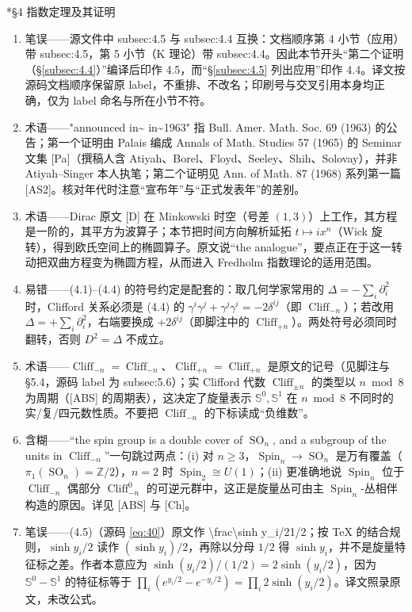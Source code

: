 \documentclass[11pt]{amsart}
\makeatletter
\def\subsection{\@startsection{subsection}{2}%
   \z@{1.25\linespacing\@plus.7\linespacing}{.5\linespacing}%
   {\normalfont\bfseries}}
\theoremstyle{definition}
\theoremstyle{remark}
\theoremstyle{plain}
\numberwithin{equation}{section}
\renewcommand{\:}{\colon}
\DeclareMathOperator{\Spin}{Spin}
\newcommand{\ZZ}{{\mathbb Z}}
\DeclareMathOperator{\SO}{SO}
\DeclareMathOperator{\Cliff}{Cliff}
\newcommand{\Cnm}{\Cliff_{-n}}
\newcommand{\Cnp}{\Cliff_{+n}}
\renewcommand{\SS}{\mathbb{S}}
\makeatother
\begin{document}
\subsection*{§4 指数定理及其证明}
\begin{enumerate}[leftmargin=2.2em,itemsep=2pt,topsep=2pt]
  \item 笔误——源文件中 subsec:4.5 与 subsec:4.4 互换：文档顺序第 4 小节（应用）带 subsec:4.5，第 5 小节（K 理论）带 subsec:4.4。因此本节开头“第二个证明（\S\ref{subsec:4.4}）”编译后印作 4.5，而“\S\ref{subsec:4.5} 列出应用”印作 4.4。译文按源码文档顺序保留原 label，不重排、不改名；印刷号与交叉引用本身均正确，仅为 label 命名与所在小节不符。
  \item 术语——"announced in\textasciitilde{}\cite{AS1} in\textasciitilde{}1963" 指 Bull. Amer. Math. Soc. 69 (1963) 的公告；第一个证明由 Palais 编成 Annals of Math. Studies 57 (1965) 的 Seminar 文集 [Pa]（撰稿人含 Atiyah、Borel、Floyd、Seeley、Shih、Solovay），并非 Atiyah–Singer 本人执笔；第二个证明见 Ann. of Math. 87 (1968) 系列第一篇 [AS2]。核对年代时注意“宣布年”与“正式发表年”的差别。
  \item 术语——Dirac 原文 [D] 在 Minkowski 时空（号差 $(1,3)$）上工作，其方程是一阶的，其平方为波算子；本节把时间方向解析延拓 $t\mapsto i x^n$（Wick 旋转），得到欧氏空间上的椭圆算子。原文说“the analogue”，要点正在于这一转动把双曲方程变为椭圆方程，从而进入 Fredholm 指数理论的适用范围。
  \item 易错——(4.1)–(4.4) 的符号约定是配套的：取几何学家常用的 $\Delta=-\sum_i\partial_i^2$ 时，Clifford 关系必须是 (4.4) 的 $\gamma^i\gamma^j+\gamma^j\gamma^i=-2\delta^{ij}$（即 $\Cliff_{-n}$）；若改用 $\Delta=+\sum_i\partial_i^2$，右端要换成 $+2\delta^{ij}$（即脚注中的 $\Cnp$）。两处符号必须同时翻转，否则 $D^2=\Delta$ 不成立。
  \item 术语——$\Cnm=\Cliff_{-n}$、$\Cnp=\Cliff_{+n}$ 是原文的记号（见脚注与 §5.4，源码 label 为 subsec:5.6）；实 Clifford 代数 $\Cliff_{\pm n}$ 的类型以 $n\bmod 8$ 为周期（[ABS] 的周期表），这决定了旋量表示 $\SS^0,\SS^1$ 在 $n\bmod 8$ 不同时的实/复/四元数性质。不要把 $\Cnm$ 的下标读成“负维数”。
  \item 含糊——“the spin group is a double cover of $\SO_n$, and a subgroup of the units in $\Cnm$”一句跳过两点：(i) 对 $n\ge3$，$\Spin_n\to\SO_n$ 是万有覆盖（$\pi_1(\SO_n)=\ZZ/2$），$n=2$ 时 $\Spin_2\cong U(1)$；(ii) 更准确地说 $\Spin_n$ 位于 $\Cnm$ 偶部分 $\Cliff^0_{-n}$ 的可逆元群中，这正是旋量丛可由主 $\Spin_n$-丛相伴构造的原因。详见 [ABS] 与 [Ch]。
  \item 笔误——(4.5)（源码 \eqref{eq:40}）原文作 \textbackslash{}frac{\textbackslash{}sinh y\_i/2}{1/2}；按 TeX 的结合规则，$\sinh y_i/2$ 读作 $(\sinh y_i)/2$，再除以分母 $1/2$ 得 $\sinh y_i$，并不是旋量特征标之差。作者本意应为 $\sinh(y_i/2)/(1/2)=2\sinh(y_i/2)$，因为 $\SS^0-\SS^1$ 的特征标等于 $\prod_i(e^{y_i/2}-e^{-y_i/2})=\prod_i 2\sinh(y_i/2)$。译文照录原文，未改公式。

\end{enumerate}
\end{document}
